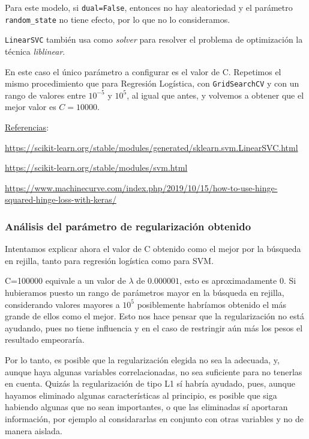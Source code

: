 \documentclass[a4]{article}
\begin{document}
Para este modelo, si \lstinline|dual=False|, entonces no hay aleatoriedad y el parámetro \lstinline|random_state| no tiene efecto, por lo que no lo consideramos. 

\lstinline|LinearSVC| también usa como \textit{solver} para resolver el problema de optimización la técnica \textit{liblinear}. 

En este caso el único parámetro a configurar es el valor de C. Repetimos el mismo procedimiento que para Regresión Logística, con \lstinline|GridSearchCV| y con un rango de valores entre $10^{-5}$ y $10^5$, al igual que antes, y volvemos a obtener que el mejor valor es $C=10000$.

\underline{Referencias}:

\href{https://scikit-learn.org/stable/modules/generated/sklearn.svm.LinearSVC.html}{https://scikit-learn.org/stable/modules/generated/sklearn.svm.LinearSVC.html}

\href{https://scikit-learn.org/stable/modules/svm.html#tips-on-practical-use}{https://scikit-learn.org/stable/modules/svm.html}

\href{https://www.machinecurve.com/index.php/2019/10/15/how-to-use-hinge-squared-hinge-loss-with-keras/}{https://www.machinecurve.com/index.php/2019/10/15/how-to-use-hinge-squared-hinge-loss-with-keras/}

\subsubsection{Análisis del parámetro de regularización obtenido}

Intentamos explicar ahora el valor de C obtenido como el mejor por la búsqueda en rejilla, tanto para regresión logística como para SVM. 

C=100000 equivale a un valor de $\lambda$ de $0.000001$, esto es aproximadamente 0. Si hubieramos puesto un rango de parámetros mayor en la búsqueda en rejilla, considerando valores mayores a $10^5$ posiblemente habríamos obtenido el más grande de ellos como el mejor. Esto nos hace pensar que la regularización no está ayudando, pues no tiene influencia y en el caso de restringir aún más los pesos el resultado empeoraría. 

Por lo tanto, es posible que la regularización elegida no sea la adecuada, y, aunque haya algunas variables correlacionadas, no sea suficiente para no tenerlas en cuenta. Quizás la regularización de tipo L1 sí habría ayudado, pues, aunque hayamos eliminado algunas características al principio, es posible que siga habiendo algunas que no sean importantes, o que las eliminadas sí aportaran información, por ejemplo al considararlas en conjunto con otras variables y no de manera aislada. 
\end{document}
